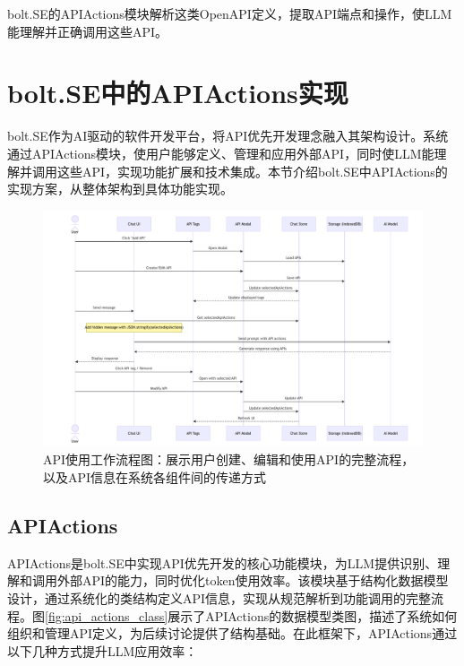 bolt.SE的APIActions模块解析这类OpenAPI定义，提取API端点和操作，使LLM能理解并正确调用这些API。
\section{bolt.SE中的APIActions实现}
bolt.SE作为AI驱动的软件开发平台，将API优先开发理念融入其架构设计。系统通过APIActions模块，使用户能够定义、管理和应用外部API，同时使LLM能理解并调用这些API，实现功能扩展和技术集成。本节介绍bolt.SE中APIActions的实现方案，从整体架构到具体功能实现。

\begin{figure}[htbp]
  \centering
  \includegraphics[width=\textwidth]{figures/api_workflow.pdf}
  \caption{API使用工作流程图：展示用户创建、编辑和使用API的完整流程，以及API信息在系统各组件间的传递方式}
  \label{fig:api_workflow}
\end{figure}

\subsection{APIActions}
APIActions是bolt.SE中实现API优先开发的核心功能模块，为LLM提供识别、理解和调用外部API的能力，同时优化token使用效率。该模块基于结构化数据模型设计，通过系统化的类结构定义API信息，实现从规范解析到功能调用的完整流程。图\ref{fig:api_actions_class}展示了APIActions的数据模型类图，描述了系统如何组织和管理API定义，为后续讨论提供了结构基础。在此框架下，APIActions通过以下几种方式提升LLM应用效率：

